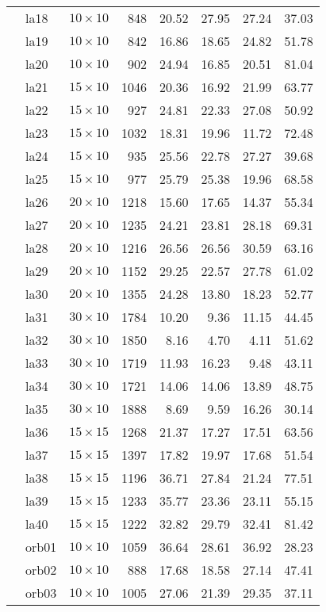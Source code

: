\begin{longtable}{|ll|c|r|rrrr|}
& la18&$10\times10$& 848 & 20.52 & 27.95 & 27.24 & 37.03\\
& la19&$10\times10$& 842 & 16.86 & 18.65 & 24.82 & 51.78\\
& la20&$10\times10$& 902 & 24.94 & 16.85 & 20.51 & 81.04\\
& la21&$15\times10$& 1046 & 20.36 & 16.92 & 21.99 & 63.77\\
& la22&$15\times10$& 927 & 24.81 & 22.33 & 27.08 & 50.92\\
& la23&$15\times10$& 1032 & 18.31 & 19.96 & 11.72 & 72.48\\
& la24&$15\times10$& 935 & 25.56 & 22.78 & 27.27 & 39.68\\
& la25&$15\times10$& 977 & 25.79 & 25.38 & 19.96 & 68.58\\
& la26&$20\times10$& 1218 & 15.60 & 17.65 & 14.37 & 55.34\\
& la27&$20\times10$& 1235 & 24.21 & 23.81 & 28.18 & 69.31\\
& la28&$20\times10$& 1216 & 26.56 & 26.56 & 30.59 & 63.16\\
& la29&$20\times10$& 1152 & 29.25 & 22.57 & 27.78 & 61.02\\
& la30&$20\times10$& 1355 & 24.28 & 13.80 & 18.23 & 52.77\\
& la31&$30\times10$& 1784 & 10.20 & 9.36 & 11.15 & 44.45\\
& la32&$30\times10$& 1850 & 8.16 & 4.70 & 4.11 & 51.62\\
& la33&$30\times10$& 1719 & 11.93 & 16.23 & 9.48 & 43.11\\
& la34&$30\times10$& 1721 & 14.06 & 14.06 & 13.89 & 48.75\\
& la35&$30\times10$& 1888 & 8.69 & 9.59 & 16.26 & 30.14\\
& la36&$15\times15$& 1268 & 21.37 & 17.27 & 17.51 & 63.56\\
& la37&$15\times15$& 1397 & 17.82 & 19.97 & 17.68 & 51.54\\
& la38&$15\times15$& 1196 & 36.71 & 27.84 & 21.24 & 77.51\\
& la39&$15\times15$& 1233 & 35.77 & 23.36 & 23.11 & 55.15\\
& la40&$15\times15$& 1222 & 32.82 & 29.79 & 32.41 & 81.42\\
\hline\pagebreak[2]
\multirow{10}{*}{$\mathcal{P}_{orb}$}
& orb01&$10\times10$& 1059 & 36.64 & 28.61 & 36.92 & 28.23\\
& orb02&$10\times10$& 888 & 17.68 & 18.58 & 27.14 & 47.41\\
& orb03&$10\times10$& 1005 & 27.06 & 21.39 & 29.35 & 37.11\\

\end{longtable}
